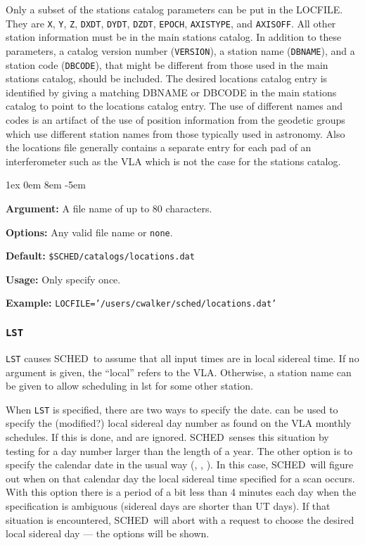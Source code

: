 \documentclass{report}
\newcommand{\schedb}{{\sc SCHED~}}
\newcommand{\rcwbox}[5]{
  \begin{list}{}{\parsep 1ex  \itemsep 0em
                 \leftmargin 8em  \itemindent -5em }
    \item {\bf Argument:} #1
    \item {\bf Options:}  #2
    \item {\bf Default:}  #3
    \item {\bf Usage:}    #4
    \item {\bf Example:}  #5
  \end{list}
}
\begin{document}
Only a subset of the stations catalog parameters can be put in the
LOCFILE.  They are {\tt X}, {\tt Y}, {\tt Z}, {\tt DXDT}, {\tt DYDT},
{\tt DZDT}, {\tt EPOCH}, {\tt AXISTYPE}, and {\tt AXISOFF}.  All other
station information must be in the main stations catalog.  In addition
to these parameters, a catalog version number ({\tt VERSION}), a
station name ({\tt DBNAME}), and a station code ({\tt DBCODE}), that
might be different from those used in the main stations catalog,
should be included.  The desired locations catalog entry is identified
by giving a matching DBNAME or DBCODE in the main stations catalog to
point to the locations catalog entry.  The use of different names and
codes is an artifact of the use of position information from the
geodetic groups which use different station names from those typically
used in astronomy.  Also the locations file generally contains a
separate entry for each pad of an interferometer such as the VLA which
is not the case for the stations catalog.

\rcwbox
{A file name of up to 80 characters.}
{Any valid file name or {\tt none}.}
{{\tt \$SCHED/catalogs/locations.dat}}
{Only specify once.}
{{\tt LOCFILE='/users/cwalker/sched/locations.dat'}}

\subsubsection{\label{MP:LST}{\tt LST}}

{\tt LST} causes \schedb to assume that all input times
are in local sidereal time. If no argument is given, the ``local''
refers to the VLA. Otherwise, a station name can be given to allow
scheduling in lst for some other station.

When {\tt LST} is specified, there are two ways to specify the date.
 can be used to specify the (modified?)
local sidereal day number as found on the VLA monthly schedules.  If
this is done,  and  are ignored. \schedb senses this situation by
testing for a day number larger than the length of a year.  The other
option is to specify the calendar date in the usual way (, , ).  In this case, \schedb will figure out when on that
calendar day the local sidereal time specified for a scan occurs.
With this option there is a period of a bit less than 4 minutes each
day when the specification is ambiguous (sidereal days are shorter than
UT days).  If that situation is encountered, \schedb will abort with
a request to choose the desired local sidereal day --- the options
will be shown.
\end{document}

